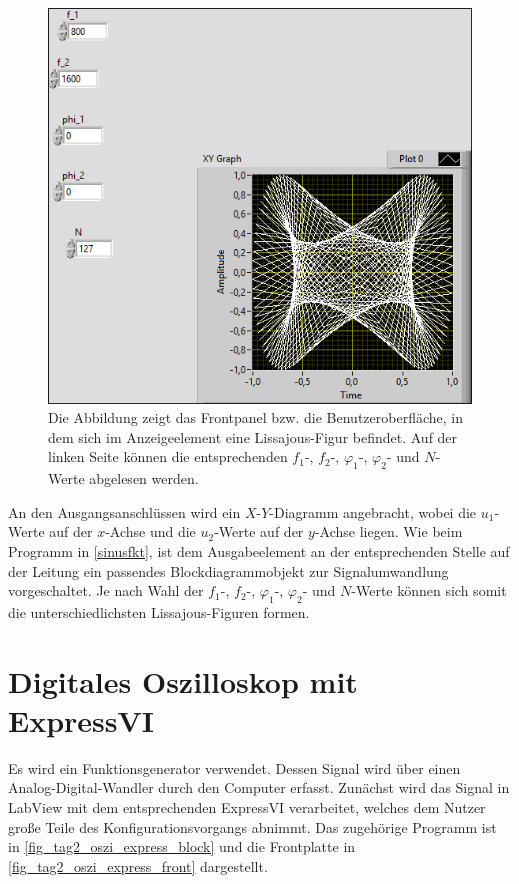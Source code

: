 \documentclass[
a4paper,
12pt,
pagesize,
ngerman
]{scrartcl}
\begin{document}
	\begin{figure}[H]
		\centering
		\includegraphics[width=1.0\textwidth]{EIRE2018Dateien/Tag1/lissajous-bilder/Lissajousp}
		\caption{Die Abbildung zeigt das Frontpanel bzw. die Benutzeroberfläche, in dem sich im Anzeigeelement eine Lissajous-Figur befindet. Auf der linken Seite können die entsprechenden $f_1$-, $f_2$-, $\varphi_1$-, $\varphi_2$- und $N$-Werte abgelesen werden.}
		\label{lissajous}
	\end{figure}

	\noindent An den Ausgangsanschlüssen wird ein $X$-$Y$-Diagramm angebracht, wobei die $u_1$-Werte auf der $x$-Achse und die $u_2$-Werte auf der $y$-Achse liegen. Wie beim Programm in \cref{sinusfkt}, ist dem Ausgabeelement an der entsprechenden Stelle auf der Leitung ein passendes Blockdiagrammobjekt zur Signalumwandlung vorgeschaltet. Je nach Wahl der $f_1$-, $f_2$-, $\varphi_1$-, $\varphi_2$- und $N$-Werte können sich somit die unterschiedlichsten Lissajous-Figuren formen.
	
	\newpage
	
	
	\section{Digitales Oszilloskop mit ExpressVI}
	Es wird ein Funktionsgenerator verwendet.
	Dessen Signal wird über einen Analog-Digital-Wandler durch den Computer erfasst.
	Zunächst wird das Signal in LabView mit dem entsprechenden ExpressVI verarbeitet, welches dem Nutzer große Teile des Konfigurationsvorgangs abnimmt.
	Das zugehörige Programm ist in \cref{fig_tag2_oszi_express_block} und die Frontplatte in \cref{fig_tag2_oszi_express_front} dargestellt.
	
\end{document}
